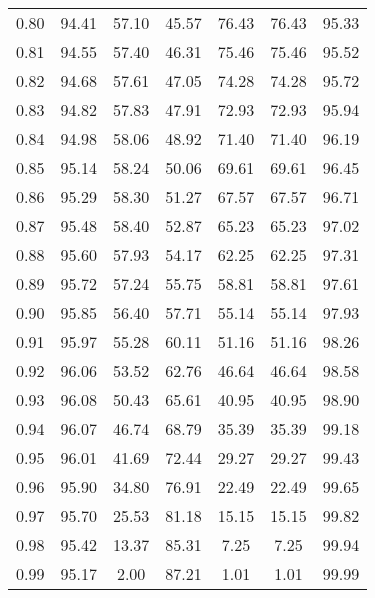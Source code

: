 \begin{tabular}{|c|c|c|c|c|c|c|}
      0.80 &     94.41 &     57.10 &      45.57 &   76.43 &      76.43 &         95.33 \\
      0.81 &     94.55 &     57.40 &      46.31 &   75.46 &      75.46 &         95.52 \\
      0.82 &     94.68 &     57.61 &      47.05 &   74.28 &      74.28 &         95.72 \\
      0.83 &     94.82 &     57.83 &      47.91 &   72.93 &      72.93 &         95.94 \\
      0.84 &     94.98 &     58.06 &      48.92 &   71.40 &      71.40 &         96.19 \\
      0.85 &     95.14 &     58.24 &      50.06 &   69.61 &      69.61 &         96.45 \\
      0.86 &     95.29 &     58.30 &      51.27 &   67.57 &      67.57 &         96.71 \\
      0.87 &     95.48 &     58.40 &      52.87 &   65.23 &      65.23 &         97.02 \\
      0.88 &     95.60 &     57.93 &      54.17 &   62.25 &      62.25 &         97.31 \\
      0.89 &     95.72 &     57.24 &      55.75 &   58.81 &      58.81 &         97.61 \\
      0.90 &     95.85 &     56.40 &      57.71 &   55.14 &      55.14 &         97.93 \\
      0.91 &     95.97 &     55.28 &      60.11 &   51.16 &      51.16 &         98.26 \\
      0.92 &     96.06 &     53.52 &      62.76 &   46.64 &      46.64 &         98.58 \\
      0.93 &     96.08 &     50.43 &      65.61 &   40.95 &      40.95 &         98.90 \\
      0.94 &     96.07 &     46.74 &      68.79 &   35.39 &      35.39 &         99.18 \\
      0.95 &     96.01 &     41.69 &      72.44 &   29.27 &      29.27 &         99.43 \\
      0.96 &     95.90 &     34.80 &      76.91 &   22.49 &      22.49 &         99.65 \\
      0.97 &     95.70 &     25.53 &      81.18 &   15.15 &      15.15 &         99.82 \\
      0.98 &     95.42 &     13.37 &      85.31 &    7.25 &       7.25 &         99.94 \\
      0.99 &     95.17 &      2.00 &      87.21 &    1.01 &       1.01 &         99.99 \\
\bottomrule
\end{tabular}
